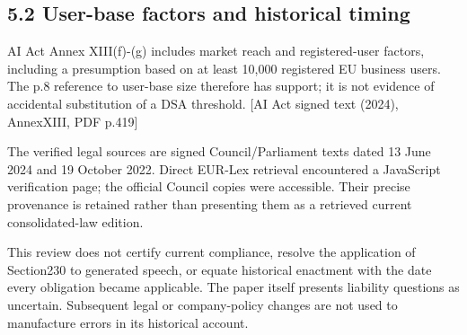 \documentclass[10pt]{article}
\begin{document}
\subsection*{5.2 User-base factors and historical timing}
AI Act Annex XIII(f)-(g) includes market reach and registered-user factors, including a presumption based on at least 10,000 registered EU business users. The p.8 reference to user-base size therefore has support; it is not evidence of accidental substitution of a DSA threshold. [AI Act signed text (2024), AnnexXIII, PDF p.419]\par
The verified legal sources are signed Council/Parliament texts dated 13 June 2024 and 19 October 2022. Direct EUR-Lex retrieval encountered a JavaScript verification page; the official Council copies were accessible. Their precise provenance is retained rather than presenting them as a retrieved current consolidated-law edition.\par
This review does not certify current compliance, resolve the application of Section230 to generated speech, or equate historical enactment with the date every obligation became applicable. The paper itself presents liability questions as uncertain. Subsequent legal or company-policy changes are not used to manufacture errors in its historical account.\par
\end{document}
